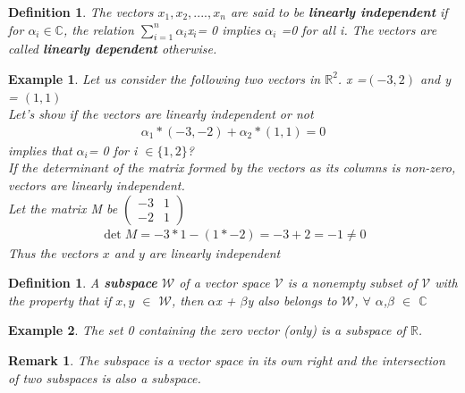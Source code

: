\documentclass[12pt,a4paper]{article}
\newtheorem{remark}[thm]{Remark}
\newtheorem{defn}[thm]{Definition}
\newtheorem{exmp}{Example}[section]
\begin{document}
\begin{defn}
The vectors $x_{1},x_{2},....,x_{n}$ are said to be \textbf{linearly independent} if for $\alpha_{i} $$\in$$\mathbb{C}$, the relation $\sum_{i=1}^{n}$$ \alpha_{i}$x$_{i} $= 0 implies $\alpha_{i}$ =0 for all i. The  vectors are called \textbf{linearly dependent} otherwise. 
\end{defn}
\begin{exmp} Let us consider the following two vectors in $\mathbb{R}^2$. x =$(-3, 2)$ and y = $(1, 1)$\\
Let's show if the vectors are linearly independent or not
\begin{align*}
 \alpha_{1} * (-3, -2) + \alpha_{2} * (1, 1) = 0
\end{align*}
  implies  that $\alpha_{i}$= 0 for i $\in \{1,2\}$?\\
If the determinant of the matrix formed by the vectors as its columns is non-zero, vectors are linearly independent.\\
Let the matrix M be
$\begin{pmatrix}
-3 & 1\\
-2 & 1
\end{pmatrix}$
\\
\begin{align*}
\det M = -3 * 1 - ( 1 * -2)  = -3 + 2 = -1 \ne 0
\end{align*}
Thus the vectors $x$ and $y$ are linearly independent
\end{exmp}
\begin{defn}
A \textbf{subspace} $\mathcal{W}$ of a vector space $\mathcal{V}$ is a nonempty subset of $\mathcal{V}$ with the property that if $x, y$ $\in$ $\mathcal{W}$, then $\alpha$x + $\beta$y also belongs to $\mathcal{W}$, $\forall$ $\alpha$,$\beta$ $\in$ $\mathbb{C}$
\end{defn}
\begin{exmp}
The set {0} containing the zero vector (only) is a subspace of $\mathbb{R}$.
\end{exmp}
\begin{remark}
The subspace is a vector space in its own right and the intersection of two subspaces is also a subspace.
\end{remark}
\end{document}
